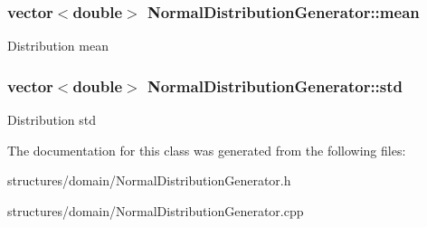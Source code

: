 \subsubsection[{\texorpdfstring{mean}{mean}}]{\setlength{\rightskip}{0pt plus 5cm}vector$<$double$>$ Normal\+Distribution\+Generator\+::mean\hspace{0.3cm}{\ttfamily [private]}}\hypertarget{class_normal_distribution_generator_a64b8ae4a574846641023d954e3143ce9}{}\label{class_normal_distribution_generator_a64b8ae4a574846641023d954e3143ce9}
Distribution mean 
\subsubsection[{\texorpdfstring{std}{std}}]{\setlength{\rightskip}{0pt plus 5cm}vector$<$double$>$ Normal\+Distribution\+Generator\+::std\hspace{0.3cm}{\ttfamily [private]}}\hypertarget{class_normal_distribution_generator_ab41e9da41497d0f6491064f4b27f5123}{}\label{class_normal_distribution_generator_ab41e9da41497d0f6491064f4b27f5123}
Distribution std 

The documentation for this class was generated from the following files\+:\begin{DoxyCompactItemize}
\item 
structures/domain/Normal\+Distribution\+Generator.\+h\item 
structures/domain/Normal\+Distribution\+Generator.\+cpp\end{DoxyCompactItemize}
